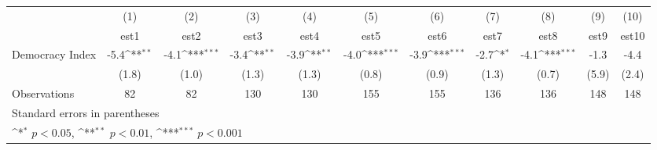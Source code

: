{
\def\sym#1{\ifmmode^{#1}\else\(^{#1}\)\fi}
\begin{tabular}{l*{10}{c}}
\hline\hline
                    &\multicolumn{1}{c}{(1)}         &\multicolumn{1}{c}{(2)}         &\multicolumn{1}{c}{(3)}         &\multicolumn{1}{c}{(4)}         &\multicolumn{1}{c}{(5)}         &\multicolumn{1}{c}{(6)}         &\multicolumn{1}{c}{(7)}         &\multicolumn{1}{c}{(8)}         &\multicolumn{1}{c}{(9)}         &\multicolumn{1}{c}{(10)}         \\
                    &        est1         &        est2         &        est3         &        est4         &        est5         &        est6         &        est7         &        est8         &        est9         &       est10         \\
\hline
Democracy Index     &        -5.4\sym{**} &        -4.1\sym{***}&        -3.4\sym{**} &        -3.9\sym{**} &        -4.0\sym{***}&        -3.9\sym{***}&        -2.7\sym{*}  &        -4.1\sym{***}&        -1.3         &        -4.4         \\
                    &       (1.8)         &       (1.0)         &       (1.3)         &       (1.3)         &       (0.8)         &       (0.9)         &       (1.3)         &       (0.7)         &       (5.9)         &       (2.4)         \\
\hline
Observations        &          82         &          82         &         130         &         130         &         155         &         155         &         136         &         136         &         148         &         148         \\
\hline\hline
\multicolumn{11}{l}{\footnotesize Standard errors in parentheses}\\
\multicolumn{11}{l}{\footnotesize \sym{*} \(p<0.05\), \sym{**} \(p<0.01\), \sym{***} \(p<0.001\)}\\
\end{tabular}
}
